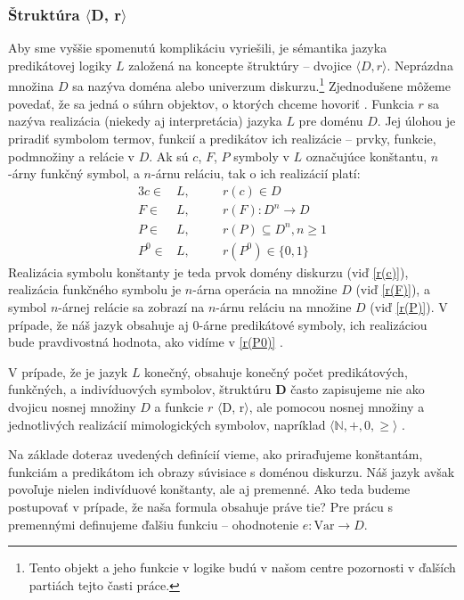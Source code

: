 \documentclass[12pt, letterpaper]{article}
\begin{document}
\subsubsection{Štruktúra $\langle$D, r$\rangle$}
Aby sme vyššie spomenutú komplikáciu vyriešili, je sémantika jazyka predikátovej logiky $L$ založená na koncepte štruktúry – dvojice $\langle D, r\rangle$. Neprázdna množina $D$ sa nazýva doména alebo univerzum diskurzu.\footnote{Tento objekt a jeho funkcie v logike budú v našom centre pozornosti v ďalších partiách tejto časti práce.} Zjednodušene môžeme povedať, že sa jedná o súhrn objektov, o ktorých chceme hovoriť \parencites[96--97]{peregrin_filosofie_2017}. Funkcia $r$ sa nazýva realizácia (niekedy aj interpretácia) jazyka $L$ pre doménu $D$. Jej úlohou je priradiť symbolom termov, funkcií a predikátov ich realizácie – prvky, funkcie, podmnožiny a relácie v $D$. Ak sú $c$, $F$, $P$ symboly v $L$ označujúce konštantu, $n$-árny funkčný symbol, a $n$-árnu reláciu, tak o ich realizácií platí:
	\begin{alignat}{3}
		c \in &L,&&\quad r(c) \in D \label{r(c)} \\
		F \in &L,&&\quad r(F): D^n \rightarrow D \label{r(F)} \\
		P \in &L,&&\quad r(P) \subseteq D^n, n\geq1 \label{r(P)} \\
		P^0 \in &L,&&\quad r(P^0) \in \{0, 1\} \label{r(P0)}
	\end{alignat}
Realizácia symbolu konštanty je teda prvok domény diskurzu (viď \ref{r(c)}), realizácia funkčného symbolu je $n$-árna operácia na množine $D$ (viď \ref{r(F)}), a symbol $n$-árnej relácie sa zobrazí na $n$-árnu reláciu na množine $D$ (viď \ref{r(P)}). V prípade, že náš jazyk obsahuje aj $0$-árne predikátové symboly, ich realizáciou bude pravdivostná hodnota, ako vidíme v \ref{r(P0)} \parencite{shapiro_classical_2022}.\par 
V prípade, že je jazyk $L$ konečný, obsahuje konečný počet predikátových, funkčných, a indivíduových symbolov, štruktúru \textbf{D} často zapisujeme nie ako dvojicu nosnej množiny $D$ a funkcie $r$ $\langle$D, r$\rangle$, ale pomocou nosnej množiny a jednotlivých realizácií mimologických symbolov, napríklad $\langle\mathbb{N}, +, 0, \geq\rangle$ \parencites[81--82]{bostock_intermediate_1997}[54]{mendelson_introduction_2015}[40--44]{raclavsky_uvod_2015}{shapiro_classical_2022}[140]{svejdar_logika_2002}. \par Na základe doteraz uvedených definícií vieme, ako priraďujeme konštantám, funkciám a predikátom ich obrazy súvisiace s doménou diskurzu. Náš jazyk avšak povoľuje nielen indivíduové konštanty, ale aj premenné. Ako teda budeme postupovať v prípade, že naša formula obsahuje práve tie? Pre prácu s premennými definujeme ďalšiu funkciu -- ohodnotenie $e: \text{Var} \rightarrow D$.\par 
\end{document}
